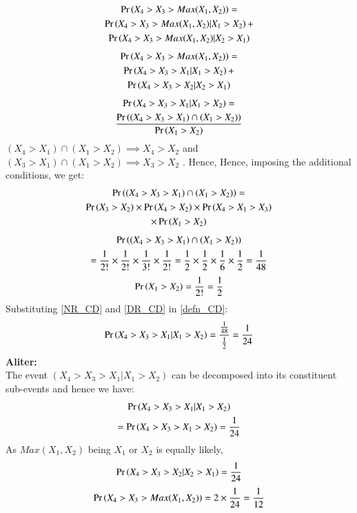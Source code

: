 \documentclass[journal,12pt,twocolumn]{IEEEtran}
\begin{document}
\begin{enumerate}
\begin{multline}
    \Pr\left(X_4 > X_3 > Max(X_1,X_2)\right) = \\\Pr\left(X_4 > X_3 > Max(X_1,X_2)| X_1>X_2\right) + \\\Pr\left(X_4 > X_3 > Max(X_1,X_2)| X_2>X_1\right)
\end{multline}
\begin{multline}
    \Pr\left(X_4 > X_3 > Max(X_1,X_2)\right) = \\\Pr\left(X_4 > X_3 > X_1| X_1>X_2\right) + \\\Pr\left(X_4 > X_3 > X_2| X_2>X_1\right)
\end{multline}
\begin{multline}
    \Pr\left(X_4 > X_3 > X_1 | X_1 > X_2 \right) = \\ \frac{\Pr\left((X_4 > X_3 > X_1) \cap (X_1 > X_2) \right)}{\Pr\left(X_1>X_2\right)} \label{defn_CD}
\end{multline}
 $(X_4>X_1) \cap (X_1>X_2) \implies X_4>X_2$ and $(X_3>X_1) \cap (X_1>X_2) \implies X_3>X_2$ . Hence, Hence, imposing the additional conditions, we get:
\begin{multline}
    \Pr\left((X_4 > X_3 > X_1) \cap (X_1 > X_2)\right) = \\\Pr\left(X_3>X_2\right) \times \Pr\left(X_4>X_2\right) \times \Pr\left(X_4 > X_1 > X_3\right) \\\times \Pr\left(X_1 > X_2\right)
\end{multline}
\begin{multline}
 \Pr\left((X_4 > X_3 > X_1) \cap (X_1 > X_2)\right)\\
    = \frac{1}{2!}\times \frac{1}{2!}\times \frac{1}{3!}\times \frac{1}{2!}
    = \frac{1}{2}\times \frac{1}{2}\times \frac{1}{6}\times \frac{1}{2}= \frac{1}{48} \label{NR_CD}
\end{multline}
\begin{align}
    \Pr\left(X_1>X_2\right) = \frac{1}{2!} = \frac{1}{2} \label{DR_CD}
\end{align}
Substituting \eqref{NR_CD} and \eqref{DR_CD} in \eqref{defn_CD}:
\begin{align}
    \Pr\left(X_4 > X_3 > X_1 | X_1 > X_2 \right) = \dfrac{\frac{1}{48}}{\frac{1}{2}} = \frac{1}{24}
\end{align}
\textbf{Aliter:}\\
The event $(X_4 > X_3 > X_1 | X_1 > X_2)$ can be decomposed into its constituent sub-events and hence we have:
\begin{multline}
    \Pr\left(X_4 > X_3 > X_1|X_1>X_2\right) \\= \Pr\left(X_4 > X_3 > X_1 > X_2\right) = \frac{1}{24}
\end{multline}
As $Max(X_1,X_2)$ being $X_1$ or $X_2$ is equally likely,
\begin{align}
\Pr\left(X_4 > X_3 > X_2| X_2 > X_1\right) = \frac{1}{24}
\end{align}
\begin{align}
    \Pr\left(X_4 > X_3 > Max(X_1,X_2)\right) = 2 \times \frac{1}{24} = \frac{1}{12}
\end{align}
\end{enumerate}

\bigskip
{}
\end{document}
